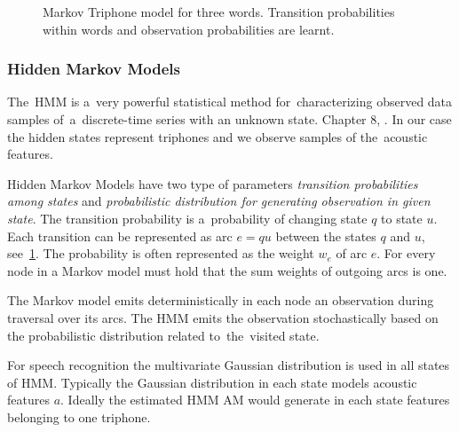 {%

\begin{figure}[!htp]
    \begin{center}
    
    \caption{Markov Triphone model for three words. Transition probabilities within
    words and observation probabilities are learnt.}
    \label{fig:hmm_words} 
    \end{center}
\end{figure}


%     
%     

\subsubsection*{Hidden Markov Models}
The~\ac{HMM} is a~very powerful statistical method for~characterizing observed data samples
of~a~discrete-time series with an unknown state. Chapter 8, \cite{huang2001spoken}.
In our case the hidden states represent triphones and we observe samples of the~acoustic features.

Hidden Markov Models have two type of parameters {\it transition probabilities among states}\/
and {\it probabilistic distribution for generating observation in given state}.
The transition probability is a~probability of changing state $q$ to state $u$.
Each transition can be represented as arc $e=qu$ between the states $q$ and $u$, see~\ref{fig:hmm_words}.
The probability is often represented as the weight $w_e$ of arc $e$.
For every node in a Markov model must hold that the sum weights of outgoing arcs is one.

The Markov model emits deterministically in each node an observation during traversal over its arcs.
The \acl{HMM} emits the observation stochastically based on the probabilistic distribution related
to~the~visited state.

For speech recognition the multivariate Gaussian distribution is used in all states of \ac{HMM}. 
Typically the Gaussian distribution in each state models acoustic features $a$.
Ideally the estimated \ac{HMM} \ac{AM} would generate in each state features belonging to one triphone.

}

